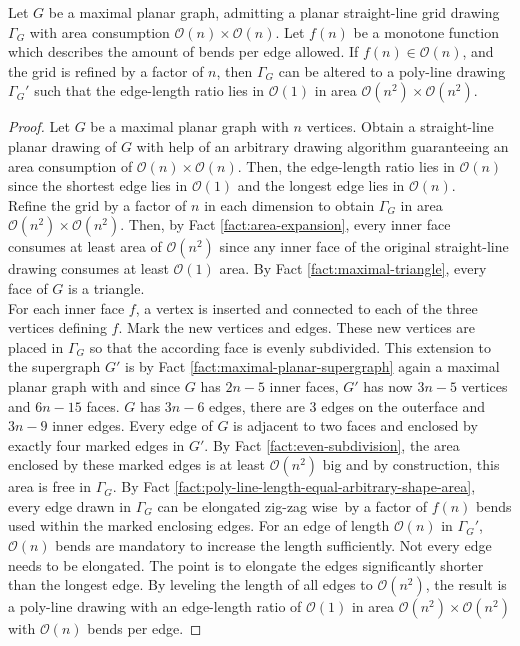 \begin{theorem}\label{theorem:max-planar-ratio1}
\end{theorem}
Let $G$ be a maximal planar graph, admitting a planar straight-line grid drawing $\Gamma_G$ with area consumption $\mathcal{O}(n) \times \mathcal{O}(n)$. Let $f(n)$ be a monotone function which describes the amount of bends per edge allowed. If $f(n) \in \mathcal{O}(n)$, and the grid is refined by a factor of $n$, then $\Gamma_G$ can be altered to a poly-line drawing $\Gamma_G'$ such that the edge-length ratio lies in $\mathcal{O}(1)$ in area $\mathcal{O}(n^2) \times \mathcal{O}(n^2)$.
\begin{proof}
	Let $G$ be a maximal planar graph with $n$ vertices. Obtain a straight-line planar drawing of $G$ with help of an arbitrary drawing algorithm guaranteeing an area consumption of $\mathcal{O}(n) \times \mathcal{O}(n)$. Then, the edge-length ratio lies in $\mathcal{O}(n)$ since the shortest edge lies in $\mathcal{O}(1)$ and the longest edge lies in $\mathcal{O}(n)$.\\
	Refine the grid by a factor of $n$ in each dimension to obtain $\Gamma_G$ in area $\mathcal{O}(n^2)\times \mathcal{O}(n^2)$. Then, by Fact \ref{fact:area-expansion}, every inner face consumes at least area of $\mathcal{O}(n^2)$ since any inner face of the original straight-line drawing consumes at least $\mathcal{O}(1)$ area. By Fact \ref{fact:maximal-triangle}, every face of $G$ is a triangle.\\
	For each inner face $f$, a vertex is inserted and connected to each of the three vertices defining $f$. Mark the new vertices and edges. These new vertices are placed in $\Gamma_G$ so that the according face is evenly subdivided. This extension to the supergraph $G'$ is by Fact \ref{fact:maximal-planar-supergraph} again a maximal planar graph with and since $G$ has $2n-5$ inner faces, $G'$ has now $3n-5$ vertices and $6n-15$ faces. $G$ has $3n-6$ edges, there are 3 edges on the outerface and $3n-9$ inner edges. Every edge of $G$ is adjacent to two faces and enclosed by exactly four marked edges in $G'$. By Fact \ref{fact:even-subdivision}, the area enclosed by these marked edges is at least $\mathcal{O}(n^2)$ big and by construction, this area is free in $\Gamma_G$. By Fact \ref{fact:poly-line-length-equal-arbitrary-shape-area}, every edge drawn in $\Gamma_G$ can be elongated \grqq zig-zag wise\grqq~by a factor of $f(n)$ bends used within the marked enclosing edges. For an edge of length $\mathcal{O}(n)$ in $\Gamma_G'$, $\mathcal{O}(n)$ bends are mandatory to increase the length sufficiently. Not every edge needs to be elongated. The point is to elongate the edges significantly shorter than the longest edge. By leveling the length of all edges to $\mathcal{O}(n^2)$, the result is a poly-line drawing with an edge-length ratio of $\mathcal{O}(1)$ in area $\mathcal{O}(n^2)\times \mathcal{O}(n^2)$ with $\mathcal{O}(n)$ bends per edge.
\end{proof}

